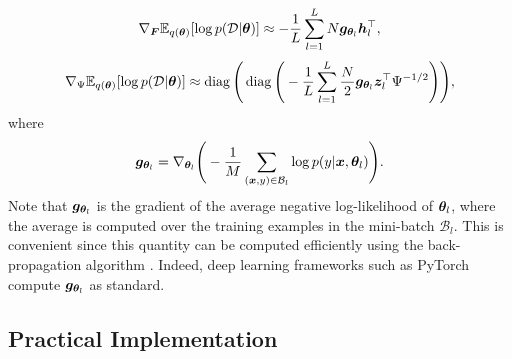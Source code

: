 \documentclass[10pt]{article} %
\newcommand{\diag}{\mathop{\mathrm{diag}}}
\begin{document}
\begin{equation}
	 \nabla_{\bm{F}} \mathbb{E}_{q({\bm{\theta}})} [\log p(\mathcal{D} | {\bm{\theta}})]
	 \approx -\frac{1}{L} \sum_{l=1}^{L} N {\bm{g}}_{{\bm{\theta}}_l} {\bm{h}}_l^\top,
\end{equation}
\begin{equation}\label{eqn:grad_likelihood_wrt_psi}
	 \nabla_\Psi \E_{q(\vtheta)} [\log p(\mathcal{D} | \vtheta)] \approx \diag\Bigg( \diag\Bigg( -\frac{1}{L} \sum_{l=1}^{L} \frac{N}{2} \vg_{\vtheta_l} \vz_l^\top \Psi^{-1/2} \Bigg)\Bigg),
\end{equation}
where
\begin{equation}
	{\bm{g}}_{{\bm{\theta}}_l} = \nabla_{{\bm{\theta}}_l} \Bigg( -\frac{1}{M} \sum_{({\bm{x}}, y) \in \mathcal{B}_l} \log p(y | {\bm{x}}, {\bm{\theta}}_l) \Bigg).
\end{equation}
Note that ${\bm{g}}_{{\bm{\theta}}_l}$ is the gradient of the average negative log-likelihood of ${\bm{\theta}}_l$, where the average is computed over the training examples in the mini-batch $\mathcal{B}_l$. This is convenient since this quantity can be computed efficiently using the back-propagation algorithm \citep{rumelhart1986}. Indeed, deep learning frameworks such as PyTorch \citep{paszke2019} compute ${\bm{g}}_{{\bm{\theta}}_l}$ as standard. 


\subsection{Practical Implementation}
\end{document}
